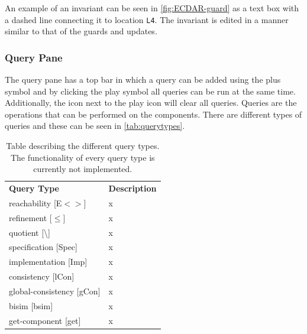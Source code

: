 An example of an invariant can be seen in \autoref{fig:ECDAR-guard} as a text box with a dashed line connecting it to location \texttt{L4}. The invariant is edited in a manner similar to that of the guards and updates. 


\subsubsection{Query Pane}
The query pane has a top bar in which a query can be added using the plus symbol and by clicking the play symbol all queries can be run at the same time. Additionally, the icon next to the play icon will clear all queries. Queries are the operations that can be performed on the components. There are different types of queries and these can be seen in \autoref{tab:querytypes}. 

\begin{table}[H]
\begin{tabular}{ll}
\textbf{Query Type} & \textbf{Description} \\
reachability [E$<>$]     & x                    \\
refinement [$\leq$]      & x                    \\
quotient [\textbackslash]& x                    \\
specification [Spec]     & x                    \\
implementation [Imp]     & x                    \\
consistency [lCon]       & x                    \\
global-consistency [gCon]& x                    \\
bisim [bsim]             & x                    \\
get-component [get]      & x                    \\
\end{tabular}
\caption{\label{tab:querytypes}Table describing the different query types. The functionality of every query type is currently not implemented.}
\end{table}

